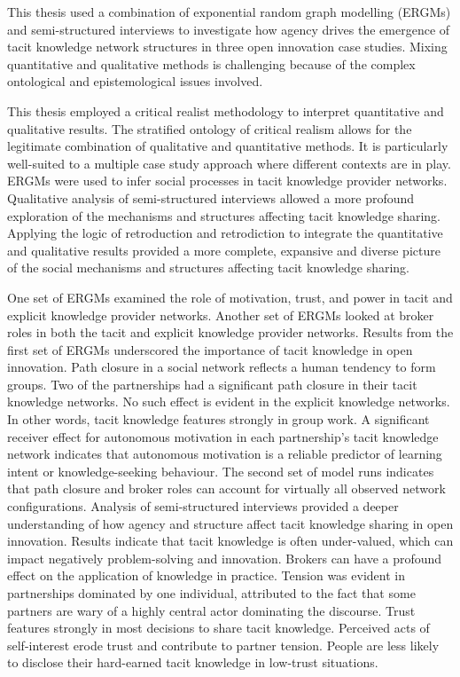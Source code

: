 This thesis used a combination of exponential random graph modelling (ERGMs) and semi-structured interviews to investigate how agency drives the emergence of tacit knowledge network structures in three open innovation case studies. Mixing quantitative and qualitative methods is challenging because of the complex ontological and epistemological issues involved. 

This thesis employed a critical realist methodology to interpret quantitative and qualitative results. The stratified ontology of critical realism allows for the legitimate combination of qualitative and quantitative methods. It is particularly well-suited to a multiple case study approach where different contexts are in play. ERGMs were used to infer social processes in tacit knowledge provider networks. Qualitative analysis of semi-structured interviews allowed a more profound exploration of the mechanisms and structures affecting tacit knowledge sharing. Applying the logic of retroduction and retrodiction to integrate the quantitative and qualitative results provided a more complete, expansive and diverse picture of the social mechanisms and structures affecting tacit knowledge sharing. \medskip

One set of ERGMs examined the role of motivation, trust, and power in tacit and explicit knowledge provider networks. Another set of ERGMs looked at broker roles in both the tacit and explicit knowledge provider networks. Results from the first set of ERGMs underscored the importance of tacit knowledge in open innovation. Path closure in a social network reflects a human tendency to form groups. Two of the partnerships had a significant path closure in their tacit knowledge networks. No such effect is evident in the explicit knowledge networks. In other words, tacit knowledge features strongly in group work. A significant receiver effect for autonomous motivation in each partnership's tacit knowledge network indicates that autonomous motivation is a reliable predictor of learning intent or knowledge-seeking behaviour. The second set of model runs indicates that path closure and broker roles can account for virtually all observed network configurations. Analysis of semi-structured interviews provided a deeper understanding of how agency and structure affect tacit knowledge sharing in open innovation. Results indicate that tacit knowledge is often under-valued, which can impact negatively problem-solving and innovation. Brokers can have a profound effect on the application of knowledge in practice. Tension was evident in partnerships dominated by one individual, attributed to the fact that some partners are wary of a highly central actor dominating the discourse. Trust features strongly in most decisions to share tacit knowledge. Perceived acts of self-interest erode trust and contribute to partner tension. People are less likely to disclose their hard-earned tacit knowledge in low-trust situations. \medskip

